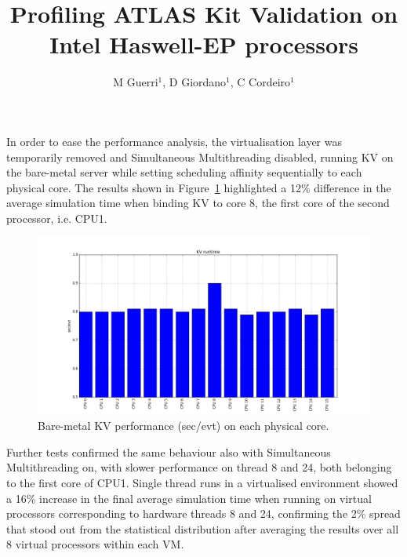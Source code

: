 \documentclass[a4paper]{jpconf}
\begin{document}
\title{Profiling ATLAS Kit Validation on \newline Intel Haswell-EP processors}

\author{M Guerri$^1$, D Giordano$^1$, C Cordeiro$^1$}
\address{$^1$ CERN}




In order to ease the performance analysis, the virtualisation layer was
temporarily removed and Simultaneous Multithreading disabled, running KV on 
the bare-metal server while setting scheduling affinity sequentially to each physical
core. The results shown
in Figure~\ref{kv-runtime} highlighted a 12\% difference in the average simulation
time when binding KV to core 8, the first core of the second processor, i.e. CPU1.

\begin{figure}[b]
\begin{center}
\includegraphics[scale=0.3]{images/kv_runtime.png}
\end{center}
\caption{\label{kv-runtime} Bare-metal KV performance (sec/evt) on each physical core. }
\end{figure}
Further tests confirmed the same behaviour also with Simultaneous Multithreading 
on, with slower performance on thread 8 and 24, both belonging to the first core of 
CPU1. Single thread runs in a virtualised environment showed a 16\%
increase in the final average simulation time when running on virtual processors
corresponding to hardware threads 8 and 24, confirming the 2\%
spread that stood out from the statistical distribution after averaging the results
over all 8 virtual processors within each VM. 
\end{document}
